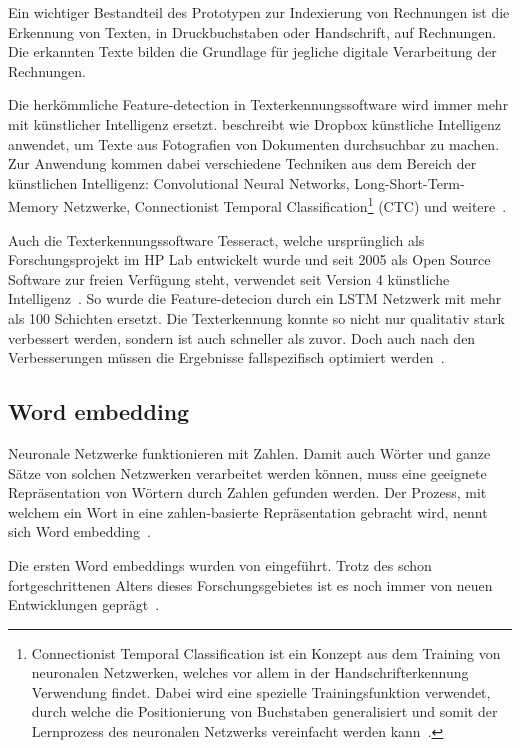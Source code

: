 Ein wichtiger Bestandteil des Prototypen zur Indexierung von Rechnungen ist die Erkennung von Texten, in Druckbuchstaben oder Handschrift, auf Rechnungen. Die erkannten Texte bilden die Grundlage für jegliche digitale Verarbeitung der Rechnungen.

Die herkömmliche Feature-detection in Texterkennungssoftware wird immer mehr mit künstlicher Intelligenz ersetzt. \textcite{Neuberg2017} beschreibt wie Dropbox künstliche Intelligenz anwendet, um Texte aus Fotografien von Dokumenten durchsuchbar zu machen. Zur Anwendung kommen dabei verschiedene Techniken aus dem Bereich der künstlichen Intelligenz: Convolutional Neural Networks, Long-Short-Term-Memory Netzwerke, Connectionist Temporal Classification\footnote{Connectionist Temporal Classification ist ein Konzept aus dem Training von neuronalen Netzwerken, welches vor allem in der Handschrifterkennung Verwendung findet. Dabei wird eine spezielle Trainingsfunktion verwendet, durch welche die Positionierung von Buchstaben generalisiert und somit der Lernprozess des neuronalen Netzwerks vereinfacht werden kann~\autocite{Scheidl2018}.} (CTC) und weitere~\autocite{Neuberg2017}.

Auch die Texterkennungssoftware Tesseract, welche ursprünglich als Forschungsprojekt im HP Lab entwickelt wurde und seit 2005 als Open Source Software zur freien Verfügung steht, verwendet seit Version 4 künstliche Intelligenz~\autocite{Smith2007}. So wurde die Feature-detecion durch ein LSTM Netzwerk mit mehr als 100 Schichten ersetzt. Die Texterkennung konnte so nicht nur qualitativ stark verbessert werden, sondern ist auch schneller als zuvor. Doch auch nach den Verbesserungen müssen die Ergebnisse fallspezifisch optimiert werden~\autocite{O.V.2018, O.V.2018a}.

\subsection{Word embedding}
\label{chap:embedding}

Neuronale Netzwerke funktionieren mit Zahlen. Damit auch Wörter und ganze Sätze von solchen Netzwerken verarbeitet werden können, muss eine geeignete Repräsentation von Wörtern durch Zahlen gefunden werden. Der Prozess, mit welchem ein Wort in eine zahlen-basierte Repräsentation gebracht wird, nennt sich Word embedding~\autocite{Olah2014b}.

Die ersten Word embeddings wurden von \textcite{Bengio2001} eingeführt. Trotz des schon fortgeschrittenen Alters dieses Forschungsgebietes ist es noch immer von neuen Entwicklungen geprägt~\autocite{Olah2014b}.

